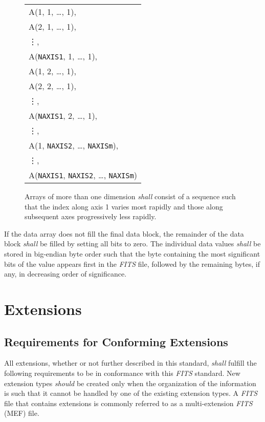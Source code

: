 \documentclass[11pt,makeidx]{book}     %
\begin{document}
\begin{figure}[t]
 \begin{center}
\begin{tabular}{l} \\
          A(1, 1, \ldots, 1), \\ 
          A(2, 1, \ldots, 1), \\ 
          \hspace{0.5in}\vdots, \\ 
          A({\tt NAXIS1}, 1, \ldots, 1), \\
          A(1, 2, \ldots, 1), \\ 
          A(2, 2, \ldots, 1), \\ 
          \hspace{0.5in}\vdots, \\ 
          A({\tt NAXIS1}, 2, \ldots, 1), \\
          \hspace{0.5in}\vdots,          \\ 
          A(1, {\tt NAXIS2}, \ldots, {\tt NAXISm}), \\  
          \hspace{0.5in}\vdots,  \\ 
          A({\tt NAXIS1}, {\tt NAXIS2}, \ldots, {\tt NAXISm}) \\
\end{tabular}
\end{center}
\caption[Array data sequence]
   {Arrays of more than one dimension {\em shall} consist of a sequence 
   such that the index along axis 1 varies most rapidly and 
   those along subsequent axes progressively less rapidly. }
\label{f:array}

\end{figure}

   If the data array does not fill the final data block, the
   remainder of the data block {\em shall} be filled by setting all bits to zero.  
   The individual data values {\em shall} be stored in big-endian byte order such
   that the byte containing the most significant bits of the value appears
   first in the  {\em FITS\/} file, followed by the remaining bytes, if any,
   in decreasing order of significance.
  
  \section{Extensions}
  
   \subsection{Requirements for Conforming Extensions}
    \label{s:genext}  
   All extensions, 
   whether or not further described in this standard, {\em shall}
   fulfill the following requirements to be in conformance with
   this {\em FITS\/} standard. 
   New extension types {\em should} be created only when the organization
   of the information is such that it cannot be handled by one of 
   the existing extension types.  A {\em FITS\/} file that contains
   extensions is commonly referred to as a multi-extension {\em FITS\/} (MEF)
   file.
   
\end{document}
